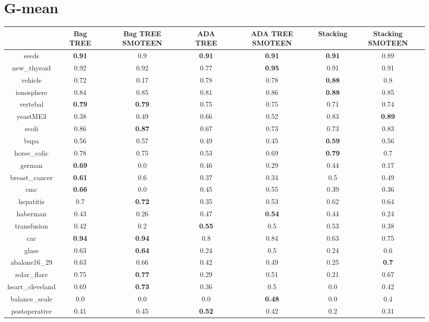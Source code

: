 \documentclass{article}%
\begin{document}
\section*{G{-}mean}%
\begin{tabular}{c|cccccc}%
&Bag TREE&Bag TREE SMOTEEN&ADA TREE&ADA TREE SMOTEEN&Stacking&Stacking SMOTEEN\\%
\hline%
seeds&\textbf{0.91}&0.9&\textbf{0.91}&\textbf{0.91}&\textbf{0.91}&0.89\\%
new\_thyroid&0.92&0.92&0.77&\textbf{0.95}&0.91&0.91\\%
vehicle&0.72&0.17&0.78&0.78&\textbf{0.88}&0.8\\%
ionosphere&0.84&0.85&0.81&0.86&\textbf{0.88}&0.85\\%
vertebal&\textbf{0.79}&\textbf{0.79}&0.75&0.75&0.71&0.74\\%
yeastME3&0.38&0.49&0.66&0.52&0.83&\textbf{0.89}\\%
ecoli&0.86&\textbf{0.87}&0.67&0.73&0.73&0.83\\%
bupa&0.56&0.57&0.49&0.45&\textbf{0.59}&0.56\\%
horse\_colic&0.78&0.75&0.53&0.69&\textbf{0.79}&0.7\\%
german&\textbf{0.69}&0.0&0.46&0.29&0.44&0.17\\%
breast\_cancer&\textbf{0.61}&0.6&0.37&0.34&0.5&0.49\\%
cmc&\textbf{0.66}&0.0&0.45&0.55&0.39&0.36\\%
hepatitis&0.7&\textbf{0.72}&0.35&0.53&0.62&0.64\\%
haberman&0.43&0.26&0.47&\textbf{0.54}&0.44&0.24\\%
transfusion&0.42&0.2&\textbf{0.55}&0.5&0.53&0.38\\%
car&\textbf{0.94}&\textbf{0.94}&0.8&0.84&0.63&0.75\\%
glass&0.63&\textbf{0.64}&0.24&0.5&0.24&0.6\\%
abalone16\_29&0.63&0.66&0.42&0.49&0.25&\textbf{0.7}\\%
solar\_flare&0.75&\textbf{0.77}&0.29&0.51&0.21&0.67\\%
heart\_cleveland&0.69&\textbf{0.73}&0.36&0.5&0.0&0.42\\%
balance\_scale&0.0&0.0&0.0&\textbf{0.48}&0.0&0.4\\%
postoperative&0.41&0.45&\textbf{0.52}&0.42&0.2&0.31\\%
\end{tabular}

%
\end{document}
